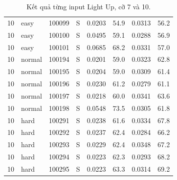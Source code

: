 \begin{table}[H]
\begin{tabular*}{\textwidth}{@{\extracolsep{\fill}}rlrcrrrr@{}}
10 & easy & 100099 & S & 0.0203 & 54.9 & 0.0313 & 56.2\\
10 & easy & 100100 & S & 0.0495 & 59.1 & 0.0288 & 56.9\\
10 & easy & 100101 & S & 0.0685 & 68.2 & 0.0331 & 57.0\\
10 & normal & 100194 & S & 0.0201 & 59.0 & 0.0323 & 62.8\\
10 & normal & 100195 & S & 0.0204 & 59.0 & 0.0309 & 61.4\\
10 & normal & 100196 & S & 0.0230 & 61.2 & 0.0279 & 61.1\\
10 & normal & 100197 & S & 0.0218 & 60.0 & 0.0341 & 63.6\\
10 & normal & 100198 & S & 0.0548 & 73.5 & 0.0305 & 61.8\\
10 & hard & 100291 & S & 0.0238 & 61.6 & 0.0334 & 67.8\\
10 & hard & 100292 & S & 0.0237 & 62.4 & 0.0284 & 66.2\\
10 & hard & 100293 & S & 0.0229 & 62.4 & 0.0348 & 67.2\\
10 & hard & 100294 & S & 0.0223 & 62.3 & 0.0293 & 68.2\\
10 & hard & 100295 & S & 0.0223 & 63.3 & 0.0314 & 69.2\\
\bottomrule\end{tabular*}
\caption{Kết quả từng input Light Up, cỡ 7 và 10.}
\end{table}
\clearpage
